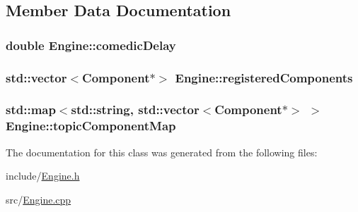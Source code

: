 \subsection{Member Data Documentation}
\subsubsection[{\texorpdfstring{comedic\+Delay}{comedicDelay}}]{\setlength{\rightskip}{0pt plus 5cm}double Engine\+::comedic\+Delay\hspace{0.3cm}{\ttfamily [private]}}\hypertarget{classEngine_a088cebe70ee006aae3fa4a5b87bb8e36}{}\label{classEngine_a088cebe70ee006aae3fa4a5b87bb8e36}
\subsubsection[{\texorpdfstring{registered\+Components}{registeredComponents}}]{\setlength{\rightskip}{0pt plus 5cm}std\+::vector$<${\bf Component}$\ast$$>$ Engine\+::registered\+Components\hspace{0.3cm}{\ttfamily [private]}}\hypertarget{classEngine_a82b1eb83c3d3c02f19cbcad2d7a22817}{}\label{classEngine_a82b1eb83c3d3c02f19cbcad2d7a22817}
\subsubsection[{\texorpdfstring{topic\+Component\+Map}{topicComponentMap}}]{\setlength{\rightskip}{0pt plus 5cm}std\+::map$<$std\+::string, std\+::vector$<${\bf Component}$\ast$$>$ $>$ Engine\+::topic\+Component\+Map\hspace{0.3cm}{\ttfamily [private]}}\hypertarget{classEngine_ab1d0191f8490a4c2edf9f3945ba91434}{}\label{classEngine_ab1d0191f8490a4c2edf9f3945ba91434}


The documentation for this class was generated from the following files\+:\begin{DoxyCompactItemize}
\item 
include/\hyperlink{Engine_8h}{Engine.\+h}\item 
src/\hyperlink{Engine_8cpp}{Engine.\+cpp}\end{DoxyCompactItemize}

